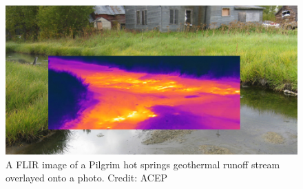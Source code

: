 \begin{figure}[hb]
	\centering
	
	\includegraphics[width=\textwidth]{figures/PilgrimFLIR.png} 

	\caption{A FLIR image of a Pilgrim hot springs geothermal runoff stream overlayed onto a photo. Credit: ACEP}
	\label{fig:pilgrimFLIR}


\end{figure}